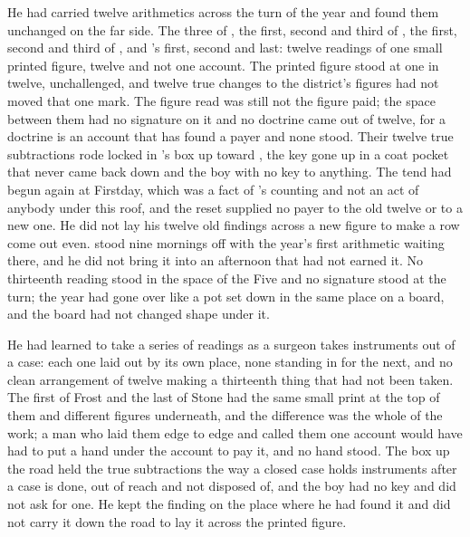 \scenebreak

He had carried twelve arithmetics across the turn of the year and found them unchanged on the far side. The three of , the first, second and third of , the first, second and third of , and 's first, second and last: twelve readings of one small printed figure, twelve and not one account. The printed figure stood at one in twelve, unchallenged, and twelve true changes to the district's figures had not moved that one mark. The figure read was still not the figure paid; the space between them had no signature on it and no doctrine came out of twelve, for a doctrine is an account that has found a payer and none stood. Their twelve true subtractions rode locked in 's box up  toward , the key gone up in a coat pocket that never came back down and the boy with no key to anything. The tend had begun again at Firstday, which was a fact of 's counting and not an act of anybody under this roof, and the reset supplied no payer to the old twelve or to a new one. He did not lay his twelve old findings across a new figure to make a row come out even.  stood nine mornings off with the year's first arithmetic waiting there, and he did not bring it into an afternoon that had not earned it. No thirteenth reading stood in the space of the Five and no signature stood at the turn; the year had gone over like a pot set down in the same place on a board, and the board had not changed shape under it.

He had learned to take a series of readings as a surgeon takes instruments out of a case: each one laid out by its own place, none standing in for the next, and no clean arrangement of twelve making a thirteenth thing that had not been taken. The first of Frost and the last of Stone had the same small print at the top of them and different figures underneath, and the difference was the whole of the work; a man who laid them edge to edge and called them one account would have had to put a hand under the account to pay it, and no hand stood. The box up the road held the true subtractions the way a closed case holds instruments after a case is done, out of reach and not disposed of, and the boy had no key and did not ask for one. He kept the finding on the place where he had found it and did not carry it down the road to lay it across the printed figure.

\scenebreak

